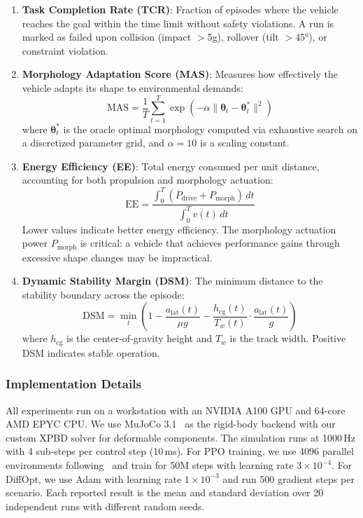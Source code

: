 \begin{enumerate}
    \item \textbf{Task Completion Rate (TCR)}: Fraction of episodes where the vehicle reaches the goal within the time limit without safety violations. A run is marked as failed upon collision (impact $>$5g), rollover (tilt $>$45°), or constraint violation.

    \item \textbf{Morphology Adaptation Score (MAS)}: Measures how effectively the vehicle adapts its shape to environmental demands:
    \begin{equation}
        \text{MAS} = \frac{1}{T} \sum_{t=1}^{T} \exp\!\left(-\alpha \|\boldsymbol{\theta}_t - \boldsymbol{\theta}_t^*\|^2\right)
    \end{equation}
    where $\boldsymbol{\theta}_t^*$ is the oracle optimal morphology computed via exhaustive search on a discretized parameter grid, and $\alpha=10$ is a scaling constant.

    \item \textbf{Energy Efficiency (EE)}: Total energy consumed per unit distance, accounting for both propulsion and morphology actuation:
    \begin{equation}
        \text{EE} = \frac{\int_0^T (P_{\text{drive}} + P_{\text{morph}})\, dt}{\int_0^T v(t)\, dt}
    \end{equation}
    Lower values indicate better energy efficiency. The morphology actuation power $P_{\text{morph}}$ is critical: a vehicle that achieves performance gains through excessive shape changes may be impractical.

    \item \textbf{Dynamic Stability Margin (DSM)}: The minimum distance to the stability boundary across the episode:
    \begin{equation}
        \text{DSM} = \min_t \left(1 - \frac{a_{\text{lat}}(t)}{\mu g} - \frac{h_{\text{cg}}(t)}{T_w(t)} \cdot \frac{a_{\text{lat}}(t)}{g}\right)
    \end{equation}
    where $h_{\text{cg}}$ is the center-of-gravity height and $T_w$ is the track width. Positive DSM indicates stable operation.
\end{enumerate}

\subsubsection{Implementation Details}
All experiments run on a workstation with an NVIDIA A100 GPU and 64-core AMD EPYC CPU. We use MuJoCo 3.1~\cite{todorov2012mujoco} as the rigid-body backend with our custom XPBD solver for deformable components. The simulation runs at 1000\,Hz with 4 sub-steps per control step (10\,ms). For PPO training, we use 4096 parallel environments following~\cite{makoviychuk2021isaac} and train for 50M steps with learning rate $3 \times 10^{-4}$. For DiffOpt, we use Adam with learning rate $1 \times 10^{-3}$ and run 500 gradient steps per scenario. Each reported result is the mean and standard deviation over 20 independent runs with different random seeds.

